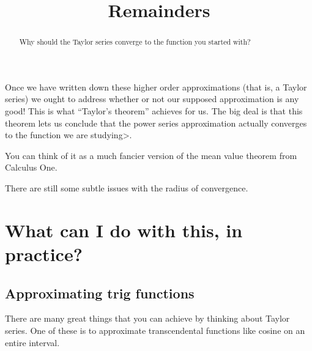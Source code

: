 \documentclass{ximera}
\title{Remainders}
\begin{document}
\begin{abstract}
  Why should the Taylor series converge to the function you started with?
\end{abstract}

\maketitle

Once we have written down these higher order approximations (that is, a Taylor series) we ought to address whether or not our supposed approximation is any good!  This is what ``Taylor's theorem'' achieves for us.  The big deal is that this theorem lets us conclude that the power series approximation actually converges to the function we are studying>.


You can think of it as a much fancier version of the mean value theorem from Calculus One.


There are still some subtle issues with the radius of convergence.


\section{What can I do with this, in practice?}

\subsection{Approximating trig functions}

There are many great things that you can achieve by thinking about Taylor series.  One of these is to approximate transcendental functions like cosine on an entire interval.

\end{document}
